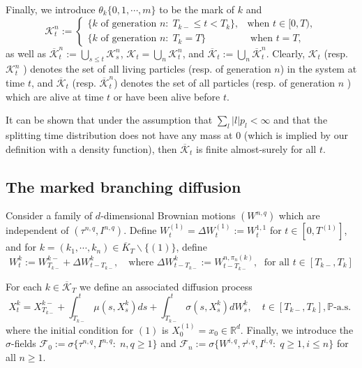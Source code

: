 \documentclass[11pt]{article}
\newcommand{\R}{\mathbb{R}}
\renewcommand{\leq}{\leqslant}
\renewcommand{\geq}{\geqslant}
\theoremstyle{definition}
\theoremstyle{remark}
\begin{document}
Finally, we introduce $\theta_k \{0, 1, \cdots, m\}$ to be the mark of $k$ and
 \[
 \mathcal K ^{n}_{t} := \begin{cases}
	 \{ k \text{ of generation }n : \; T_{k-} \leq t < T _{k} \}, & \text{when }t \in [0,T), \\
	 \{ k \text{ of generation } n : \; T_k = T \} & \text{ when } t = T,
 \end{cases}
 \]
 as well as $\overline{\mathcal K}_{t} ^{n} := \bigcup _{s \leq t} \mathcal K ^{n}_{s}$, $\mathcal K _{t} = \bigcup_n \mathcal K ^{n}_{t}$, and $\overline{\mathcal K}_{t} := \bigcup_n \overline{\mathcal K} _{t}^{n}$.
 Clearly, $\mathcal{K}_t$ (resp. $\mathcal{K}_t^n$ ) denotes the set of all living particles (resp. of generation $n$) in the system at time $t$, and $\overline{\mathcal{K}}_t$ (resp. $\overline{\mathcal{K}}_t^n$) denotes the set of all particles (resp. of generation $n$ ) which are alive at time $t$ or have been alive before $t$.

 It can be shown that under the assumption that $\sum_l |l|p_l < \infty$ and that the splitting time distribution does not have any mass at $0$ (which is implied by our definition with a density function), then $\overline{\mathcal K}_t$ is finite almost-surely for all $t$.

 \subsection{The marked branching diffusion}

 Consider a family of $d$-dimensional Brownian motions $(W ^{n,q})$ which are independent of $(\tau ^{n,q},I ^{n,q})$. Define $W _{t}^{(1)} = \Delta W _{t}^{(1)} := W ^{1,1}_{t}$ for $t \in [0,T ^{(1)}]$, and for $k = (k_1, \cdots, k_n) \in \overline{K}_{T} \backslash \{(1)\}$, define
 \[
	 W _{t}^{k} := W ^{k-}_{T _{k-}} + \Delta W ^{k}_{t - T _{k-}}, \quad \text{where } \Delta W ^{k}_{t - T _{k -}}:= W ^{n, \pi_n(k)}_{t - T _{k-}}, \; \text{ for all $t \in [T _{k-}, T_k]$}
 \]

 For each $k \in \overline{\mathcal K}_T$ we define an associated diffusion process
 \begin{equation}
	 \label{eq:sde-diffusions}
 X_t^k=X_{T_{k-}}^{k-}+\int_{T_{k-}}^t \mu(s, X_s^k) d s+\int_{T_{k-}}^t \sigma(s, X_s^k) d W_s^k, \quad t \in\left[T_{k-}, T_k\right], \mathbb{P} \text {-a.s. }
 \end{equation}
where the initial condition for $(1)$ is $X ^{(1)}_0 = x_0 \in \R ^{d}$.
Finally, we introduce the $\sigma$-fields $\mathcal F _{0} := \sigma \{ \tau ^{n,q}, I ^{n,q} : \; n,q \geq 1 \}$ and $\mathcal F _{n} := \sigma \{ W ^{i,q},\tau ^{i,q}, I ^{i,q} : \; q \geq 1, i \leq n \}$ for all $n \geq 1$.
\end{document}
